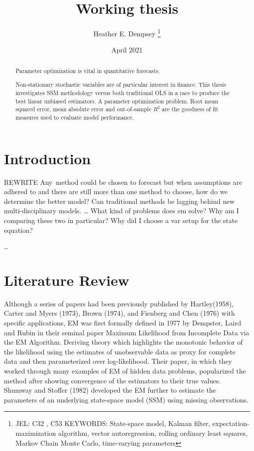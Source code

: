 \documentclass[12pt, letterpaper]{article}
\title{Working thesis}
\author{Heather E. Dempsey 
\thanks{JEL: C32 , C53 \newline
	KEYWORDS: State-space model, Kalman filter, expectation-maximization algorithm, vector autoregression, rolling ordinary least squares, Markov Chain Monte Carlo, time-varying parameters}}
\date{April 2021}
\begin{document}
	
	\begin{titlepage}
		\maketitle
	\end{titlepage}
	
	\begin{abstract}
		Parameter optimization is vital in quantitative forecasts. 
		
		Non-stationary stochastic variables are of particular interest in finance. This thesis investigates SSM methodology versus both traditional OLS in a race to produce the best linear unbiased estimators. A parameter optimization problem.   Root mean squared error, mean absolute error and out-of-sample $ R^2 $ are the goodness of fit measures used to evaluate model performance.
	\end{abstract}


\section{Introduction}
REWRITE
Any\ method could be chosen to forecast but when assumptions are adhered to and there are still more than one method to choose, how do we determine the better model? Can traditional methods be lagging behind new multi-disciplinary models.
… 
What kind of problems does em solve? Why am I comparing these two in particular? Why did I choose a var setup for the state equation?

	… 
\section{Literature Review}
Although a series of papers had been previously published by Hartley(1958), Carter and Myers (1973), Brown (1974), and Fienberg and Chen (1976) with specific applications, EM was first formally defined in 1977 by Dempster, Laird and Rubin in their seminal paper Maximum Likelihood from Incomplete Data via the EM Algorithm. Deriving theory which highlights the monotonic behavior of the likelihood using the estimates of unobservable data as proxy for complete data and then parameterized over log-likelihood. Their paper, in which they worked through many examples of EM of hidden data problems, popularized the method after showing convergence of the estimators to their true values. 
Shumway and Stoffer (1982) developed the EM further to estimate the parameters of an underlying state-space model (SSM) using missing observations. 
\end{document}
